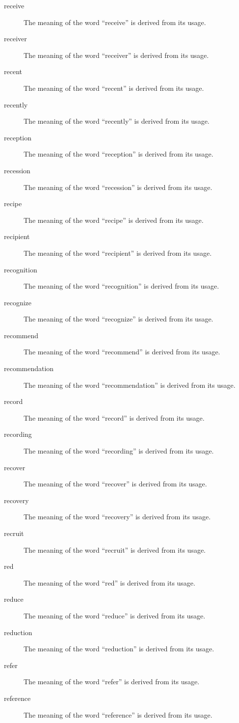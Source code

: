 \documentclass[12pt, letterpaper]{memoir}
\begin{document}
\begin{description}
\item[receive] The meaning of the word ``receive'' is derived from its usage.
\item[receiver] The meaning of the word ``receiver'' is derived from its usage.
\item[recent] The meaning of the word ``recent'' is derived from its usage.
\item[recently] The meaning of the word ``recently'' is derived from its usage.
\item[reception] The meaning of the word ``reception'' is derived from its usage.
\item[recession] The meaning of the word ``recession'' is derived from its usage.
\item[recipe] The meaning of the word ``recipe'' is derived from its usage.
\item[recipient] The meaning of the word ``recipient'' is derived from its usage.
\item[recognition] The meaning of the word ``recognition'' is derived from its usage.
\item[recognize] The meaning of the word ``recognize'' is derived from its usage.
\item[recommend] The meaning of the word ``recommend'' is derived from its usage.
\item[recommendation] The meaning of the word ``recommendation'' is derived from its usage.
\item[record] The meaning of the word ``record'' is derived from its usage.
\item[recording] The meaning of the word ``recording'' is derived from its usage.
\item[recover] The meaning of the word ``recover'' is derived from its usage.
\item[recovery] The meaning of the word ``recovery'' is derived from its usage.
\item[recruit] The meaning of the word ``recruit'' is derived from its usage.
\item[red] The meaning of the word ``red'' is derived from its usage.
\item[reduce] The meaning of the word ``reduce'' is derived from its usage.
\item[reduction] The meaning of the word ``reduction'' is derived from its usage.
\item[refer] The meaning of the word ``refer'' is derived from its usage.
\item[reference] The meaning of the word ``reference'' is derived from its usage.

\end{description}
\end{document}
